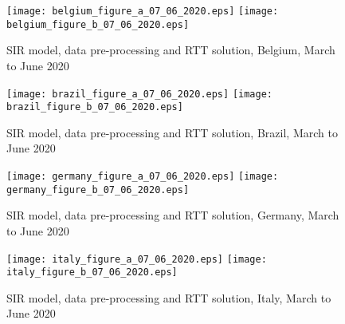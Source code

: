 \documentclass{article}
\begin{document}
\begin{figure}
\begin{center}
{\texttt{[image: belgium\_figure\_a\_07\_06\_2020.eps]}}
\qquad
{\texttt{[image: belgium\_figure\_b\_07\_06\_2020.eps]}}
\end{center}
\begin{center}
\caption{SIR model, data pre-processing and RTT solution, Belgium, March to June 2020
}
\label{fig:belgium_sir_model_07_06_2020}
\end{center}
\end{figure}

\begin{figure}
\begin{center}
{\texttt{[image: brazil\_figure\_a\_07\_06\_2020.eps]}}
\qquad
{\texttt{[image: brazil\_figure\_b\_07\_06\_2020.eps]}}
\end{center}
\begin{center}
\caption{SIR model, data pre-processing and RTT solution, Brazil, March to June 2020
}
\label{fig:brazil_sir_model_07_06_2020}
\end{center}
\end{figure}

\begin{figure}
\begin{center}
{\texttt{[image: germany\_figure\_a\_07\_06\_2020.eps]}}
\qquad
{\texttt{[image: germany\_figure\_b\_07\_06\_2020.eps]}}
\end{center}
\begin{center}
\caption{SIR model, data pre-processing and RTT solution, Germany, March to June 2020
}
\label{fig:germany_sir_model_07_06_2020}
\end{center}
\end{figure}

\begin{figure}
\begin{center}
{\texttt{[image: italy\_figure\_a\_07\_06\_2020.eps]}}
\qquad
{\texttt{[image: italy\_figure\_b\_07\_06\_2020.eps]}}
\end{center}
\begin{center}
\caption{SIR model, data pre-processing and RTT solution, Italy, March to June 2020
}
\label{fig:italy_sir_model_07_06_2020}
\end{center}
\end{figure}
\end{document}
